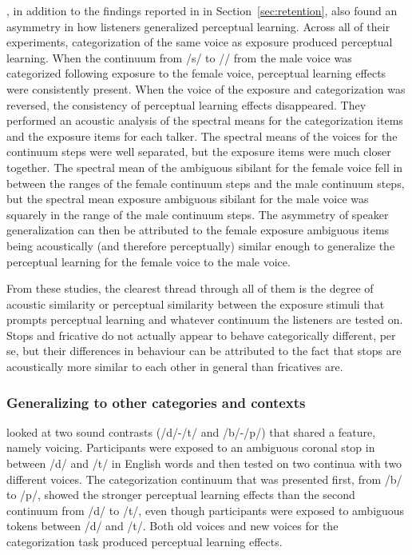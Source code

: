 \citet{Kraljic2005}, in addition to the findings reported in in Section~\ref{sec:retention}, also found an asymmetry in how listeners generalized perceptual learning.  
Across all of their experiments, categorization of the same voice as exposure produced perceptual learning.  
When the continuum from /s/ to /\textesh/ from the male voice was categorized following exposure to the female voice, perceptual learning effects were consistently present.
When the voice of the exposure and categorization was reversed, the consistency of perceptual learning effects disappeared. 
They performed an acoustic analysis of the spectral means for the categorization items and the exposure items for each talker.  
The spectral means of the voices for the continuum steps were well separated, but the exposure items were much closer together.  
The spectral mean of the ambiguous sibilant for the female voice fell in between the ranges of the female continuum steps and the male continuum steps, but the spectral mean exposure ambiguous sibilant for the male voice was squarely in the range of the male continuum steps.  
The asymmetry of speaker generalization can then be attributed to the female exposure ambiguous items being acoustically (and therefore perceptually) similar enough to generalize the perceptual learning for the female voice to the male voice.

From these studies, the clearest thread through all of them is the degree of acoustic similarity or perceptual similarity between the exposure stimuli that prompts perceptual learning and whatever continuum the listeners are tested on.  
Stops and fricative do not actually appear to behave categorically different, per se, but their differences in behaviour can be attributed to the fact that stops are acoustically more similar to each other in general than fricatives are.

\subsubsection{Generalizing to other categories and contexts}
\label{sec:othergeneralization}

\citet{Kraljic2006} looked at two sound contrasts (/d/-/t/ and /b/-/p/) that shared a feature, namely voicing.  
Participants were exposed to an ambiguous coronal stop in between /d/ and /t/ in English words and then tested on two continua with two different voices.  
The categorization continuum that was presented first, from /b/ to /p/, showed the stronger perceptual learning effects than the second continuum from /d/ to /t/, even though participants were exposed to ambiguous tokens between /d/ and /t/. 
 Both old voices and new voices for the categorization task produced perceptual learning effects.

